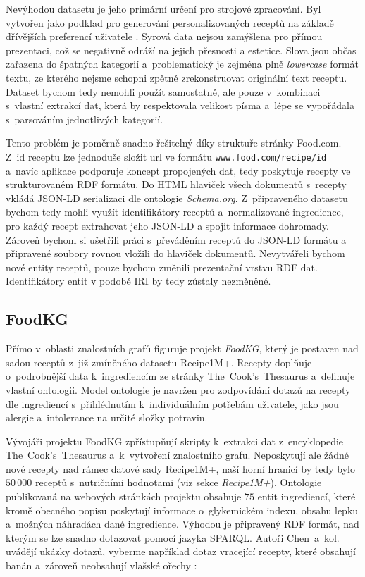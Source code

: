 Nevýhodou datasetu je jeho primární určení pro strojové zpracování. Byl vytvořen jako podklad pro generování personalizovaných receptů na základě dřívějších preferencí uživatele \citep{majumder-etal-2019-generating}. Syrová data nejsou zamýšlena pro přímou prezentaci, což se negativně odráží na jejich přesnosti a estetice. Slova jsou občas zařazena do špatných kategorií a~problematický je zejména plně \emph{lowercase} formát textu, ze kterého nejsme schopni zpětně zrekonstruovat originální text receptu. Dataset bychom tedy nemohli použít samostatně, ale pouze v~kombinaci s~vlastní extrakcí dat, která by respektovala velikost písma a~lépe se vypořádala s~parsováním jednotlivých kategorií.

Tento problém je poměrně snadno řešitelný díky struktuře stránky Food.com. Z~id receptu lze jednoduše složit url ve formátu \texttt{www.food.com/recipe/id} a~navíc aplikace podporuje koncept propojených dat, tedy poskytuje recepty ve strukturovaném RDF formátu. Do HTML hlaviček všech dokumentů s~recepty vkládá JSON-LD serializaci dle ontologie \emph{Schema.org}. Z~připraveného datasetu bychom tedy mohli využít identifikátory receptů a~normalizované ingredience, pro každý recept extrahovat jeho JSON-LD a spojit informace dohromady. Zároveň bychom si ušetřili práci s~převáděním receptů do JSON-LD formátu a připravené soubory rovnou vložili do hlaviček dokumentů. Nevytvářeli bychom nové entity receptů, pouze bychom změnili prezentační vrstvu RDF dat. Identifikátory entit v podobě IRI by tedy zůstaly nezměněné.

\subsection{FoodKG}

Přímo v~oblasti znalostních grafů figuruje projekt \emph{FoodKG}, který je postaven nad sadou receptů z~již zmíněného datasetu Recipe1M+. Recepty doplňuje o~podrobnější data k~ingrediencím ze stránky The~Cook's~Thesaurus a~definuje vlastní ontologii. Model ontologie je navržen pro zodpovídání dotazů na recepty dle ingrediencí s~přihlédnutím k~individuálním potřebám uživatele, jako jsou alergie a~intolerance na určité složky potravin.

Vývojáři projektu FoodKG zpřístupňují skripty k~extrakci dat z~encyklopedie The~Cook's~Thesaurus a~k~vytvoření znalostního grafu. Neposkytují ale žádné nové recepty nad rámec datové sady Recipe1M+, naší horní hranicí by tedy bylo $50\,000$ receptů s~nutričními hodnotami (viz sekce \emph{Recipe1M+}). Ontologie publikovaná na webových stránkách projektu obsahuje $75$ entit ingrediencí, které kromě obecného popisu poskytují informace o~glykemickém indexu, obsahu lepku a~možných náhradách dané ingredience. Výhodou je připravený RDF formát, nad kterým se lze snadno dotazovat pomocí jazyka SPARQL. Autoři Chen~a~kol. uvádějí ukázky dotazů, vyberme například dotaz vracející recepty, které obsahují banán a~zároveň neobsahují vlašské ořechy \citep{food-kg}:

